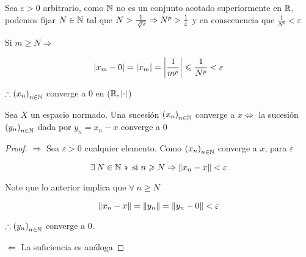 \begin{proofexplanation}
    Sea $\varepsilon > 0$ arbitrario, como $\mathbb{N}$ no es un conjunto acotado superiormente en $\mathbb{R}$, podemos fijar $N \in \mathbb{N}$ tal que $N > \frac{1}{\sqrt[\leftroot{-3}\uproot{3}p]{\varepsilon}} \Rightarrow N^p > \frac{1}{\varepsilon}$ y en consecuencia que $\frac{1}{N^p} < \varepsilon$

    Si $m \geqslant N \Rightarrow$

    $$\abs{x_m-0} = \abs{x_m} = \abs{\frac{1}{m^p}} \leqslant \frac{1}{N^p} < \varepsilon$$

    $\therefore {(x_n)}_{n \in \mathbb{N}}$ converge a 0 en ($\mathbb{R},\abs{\cdot}$)
\end{proofexplanation}

\begin{theorem}
    Sea $X$ un espacio normado. Una sucesión ${(x_n)}_{n \in \mathbb{N}}$ converge a $x \Leftrightarrow$ la sucesión ${(y_n)}_{n \in \mathbb{N}}$ dada por $y_n = x_n - x$ converge a 0
\end{theorem}

\begin{proof}
    $\Rightarrow$ Sea $\varepsilon > 0$ cualquier elemento. Como ${(x_n)}_{n \in \mathbb{N}}$ converge a $x$, para $\varepsilon$

    $$\exists \: N \in \mathbb{N} \backepsilon \text{ si } n \geqslant N \Rightarrow \norm{x_n-x} < \varepsilon $$

    Note que lo anterior implica que $\forall \: n \geqslant N$

    $$\norm{x_n-x} = \norm{y_n} = \norm{y_n - 0} < \varepsilon$$

    $\therefore {(y_n)}_{n \in \mathbb{N}}$ converge a 0.

    $\Leftarrow$ La suficiencia es análoga 
\end{proof}

